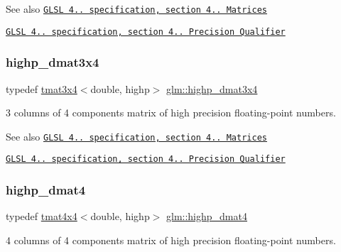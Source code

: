\begin{DoxySeeAlso}{See also}
\href{http://www.opengl.org/registry/doc/GLSLangSpec.4.20.8.pdf}{\tt G\+L\+SL 4.. specification, section 4.. Matrices} 

\href{http://www.opengl.org/registry/doc/GLSLangSpec.4.20.8.pdf}{\tt G\+L\+SL 4.. specification, section 4.. Precision Qualifier} 
\end{DoxySeeAlso}
\mbox{\label{group__core__precision_ga2f3cf8e3bd4ea0beeefe56b45b14118b}} 
\subsubsection{\texorpdfstring{highp\+\_\+dmat3x4}{highp\_dmat3x4}}
{\footnotesize\ttfamily typedef \hyperlink{structglm_1_1tmat3x4}{tmat3x4}$<$double, highp$>$ \hyperlink{group__core__precision_ga2f3cf8e3bd4ea0beeefe56b45b14118b}{glm\+::highp\+\_\+dmat3x4}}

3 columns of 4 components matrix of high precision floating-\/point numbers.

\begin{DoxySeeAlso}{See also}
\href{http://www.opengl.org/registry/doc/GLSLangSpec.4.20.8.pdf}{\tt G\+L\+SL 4.. specification, section 4.. Matrices} 

\href{http://www.opengl.org/registry/doc/GLSLangSpec.4.20.8.pdf}{\tt G\+L\+SL 4.. specification, section 4.. Precision Qualifier} 
\end{DoxySeeAlso}
\mbox{\label{group__core__precision_ga457246aa7c671b1ed3dce700b3c1d4c0}} 
\subsubsection{\texorpdfstring{highp\+\_\+dmat4}{highp\_dmat4}}
{\footnotesize\ttfamily typedef \hyperlink{structglm_1_1tmat4x4}{tmat4x4}$<$double, highp$>$ \hyperlink{group__core__precision_ga457246aa7c671b1ed3dce700b3c1d4c0}{glm\+::highp\+\_\+dmat4}}

4 columns of 4 components matrix of high precision floating-\/point numbers.

